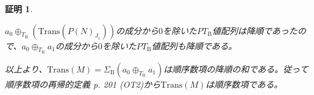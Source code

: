 \documentclass[dvipdfmx,uplatex]{jsarticle}
\newif\iffull
\theoremstyle{customnonumberbreakfortheorem}
\theoremstyle{customnonumberbreakforproof}
\newtheorem{hideableproof}{証明}
\begin{document}
\begin{hideableproof}
\begin{indented}
\begin{indented}
\begin{indented}
\begin{indented}
					\item \(a_0 \oplus_{T_{\textrm{B}}} (\textrm{Trans}(P(N)_{J_1}))\)の成分から\(0\)を除いた\(PT_{\textrm{B}}\)値配列は降順であったので、\(a_0 \oplus_{T_{\textrm{B}}} a_1\)の成分から\(0\)を除いた\(PT_{\textrm{B}}\)値配列も降順である。
				\end{indented}
				\item
				\item 以上より、\(\textrm{Trans}(M) = \Sigma_{\textrm{B}} (a_0 \oplus_{T_{\textrm{B}}} a_1)\)は順序数項の降順の和である。従って順序数項の再帰的定義\cite{buc1} p. 201 (OT2)から\(\textrm{Trans}(M)\)は順序数項である。
			\end{indented}
		\end{indented}
	\end{indented}
\end{hideableproof}

\iffull{それでは本題に戻る。}\fi
\end{document}
